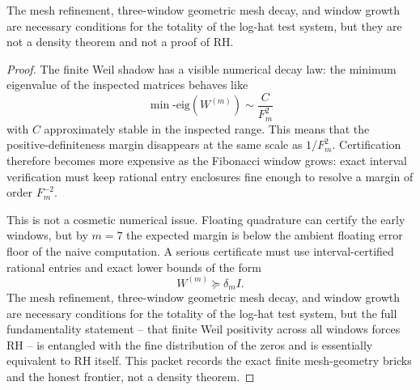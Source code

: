 \begin{theorem}
\label{thm:fibonacci-window-density-frontier}
The mesh refinement, three-window geometric mesh decay, and window growth are necessary conditions for the totality of the log-hat test system, but they are not a density theorem and not a proof of RH.
\end{theorem}
\begin{proof}
The finite Weil shadow has a visible numerical decay law: the minimum eigenvalue of the inspected matrices behaves like
$$
\min\text{-eig}(W^{(m)})\sim \frac{C}{F_m^2}
$$
with $C$ approximately stable in the inspected range. This means that the positive-definiteness margin disappears at the same scale as $1/F_m^2$. Certification therefore becomes more expensive as the Fibonacci window grows: exact interval verification must keep rational entry enclosures fine enough to resolve a margin of order $F_m^{-2}$.

This is not a cosmetic numerical issue. Floating quadrature can certify the early windows, but by $m=7$ the expected margin is below the ambient floating error floor of the naive computation. A serious certificate must use interval-certified rational entries and exact lower bounds of the form
$$
W^{(m)}\succeq \delta_m I.
$$
The mesh refinement, three-window geometric mesh decay, and window growth are necessary conditions for the totality of the log-hat test system, but the full fundamentality statement -- that finite Weil positivity across all windows forces RH -- is entangled with the fine distribution of the zeros and is essentially equivalent to RH itself. This packet records the exact finite mesh-geometry bricks and the honest frontier, not a density theorem.
\end{proof}



